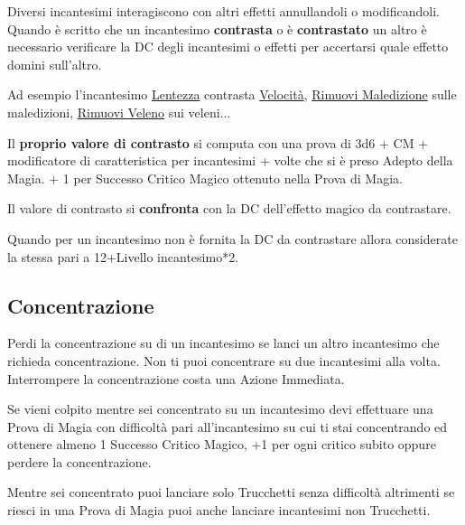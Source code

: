 \begin{multicols}{2}
Diversi incantesimi interagiscono con altri effetti annullandoli o modificandoli. Quando è scritto che un incantesimo \textbf{contrasta} o è \textbf{contrastato} un altro è necessario verificare la DC degli incantesimi o effetti per accertarsi quale effetto domini sull'altro.

Ad esempio l'incantesimo \hyperlink{Lentezza}{Lentezza} contrasta \hyperlink{Velocità}{Velocità}, \hyperlink{Rimuovi Maledizione}{Rimuovi Maledizione} sulle maledizioni, \hyperlink{Rimuovi Veleno}{Rimuovi Veleno} sui veleni...

Il \textbf{proprio valore di contrasto} si computa con una prova di 3d6 + CM + modificatore di caratteristica per incantesimi + volte che si è preso Adepto della Magia. + 1 per Successo Critico Magico ottenuto nella Prova di Magia.

Il valore di contrasto si \textbf{confronta} con la DC dell'effetto magico da contrastare.

Quando per un incantesimo non è fornita la DC da contrastare allora considerate la stessa pari a 12+Livello incantesimo*2.

\subsection{Concentrazione}\label{magieconcentrazione}\hypertarget{magieconcentrazione}{}

Perdi la concentrazione su di un incantesimo se lanci un altro incantesimo che richieda concentrazione. Non ti puoi concentrare su due incantesimi alla volta. Interrompere la concentrazione costa una Azione Immediata.

Se vieni colpito mentre sei concentrato su un incantesimo devi effettuare una Prova di Magia con difficoltà pari all'incantesimo su cui ti stai concentrando ed ottenere almeno 1 Successo Critico Magico, +1 per ogni critico subito oppure perdere la concentrazione.


Mentre sei concentrato puoi lanciare solo Trucchetti senza difficoltà altrimenti se riesci in una Prova di Magia puoi anche lanciare incantesimi non Trucchetti.


\end{multicols}

